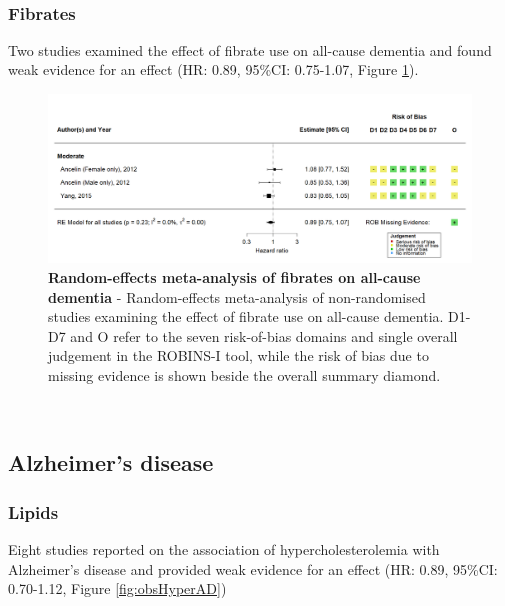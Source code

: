 \documentclass[a4paper, twoside]{templates/ociamthesis}
\begin{document}
~

\hypertarget{fibrates}{%
\subsubsection{Fibrates}\label{fibrates}}

Two studies examined the effect of fibrate use on all-cause dementia and found weak evidence for an effect (HR: 0.89, 95\%CI: 0.75-1.07, Figure \ref{fig:obsFibrateDementiaFig}).





\begin{figure}[H]
\includegraphics[width=1\linewidth]{figures/sys-rev/fp_obs_Fibrate_Dementia} \caption[Random-effects meta-analysis of fibrates on all-cause dementia]{\textbf{Random-effects meta-analysis of fibrates on all-cause dementia} - Random-effects meta-analysis of non-randomised studies examining the effect of fibrate use on all-cause dementia. D1-D7 and O refer to the seven risk-of-bias domains and single overall judgement in the ROBINS-I tool, while the risk of bias due to missing evidence is shown beside the overall summary diamond.}\label{fig:obsFibrateDementiaFig}
\end{figure}

~

\hypertarget{sys-rev-res-AD}{%
\subsection{Alzheimer's disease}\label{sys-rev-res-AD}}

\hypertarget{lipids-1}{%
\subsubsection{Lipids}\label{lipids-1}}

Eight studies reported on the association of hypercholesterolemia with Alzheimer's disease and provided weak evidence for an effect (HR: 0.89, 95\%CI: 0.70-1.12, Figure \ref{fig:obsHyperAD})
\end{document}
